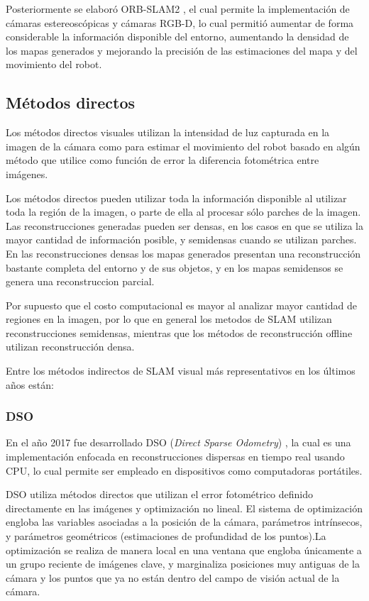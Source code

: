 Posteriormente se elaboró ORB-SLAM2 \cite{orbSlam2}, el cual permite la implementación de cámaras estereoscópicas y cámaras RGB-D,
lo cual permitió aumentar de forma considerable la información disponible del entorno, aumentando la densidad de los mapas generados y mejorando la precisión de las estimaciones del mapa y del movimiento del robot.


\subsection{Métodos directos}

Los métodos directos visuales utilizan la intensidad de luz capturada en la imagen de la cámara como para estimar el movimiento del robot basado en algún método que utilice como función de error la diferencia fotométrica entre imágenes. 

Los métodos directos pueden utilizar toda la información disponible al utilizar toda la región de la imagen, o parte de ella al procesar sólo parches de la imagen. Las reconstrucciones generadas pueden ser densas, en los casos en que se utiliza la mayor cantidad de información posible, y semidensas cuando se utilizan parches. En las reconstrucciones densas los mapas generados presentan una reconstrucción bastante completa del entorno y de sus objetos, y en los mapas semidensos se genera una reconstruccion parcial.

Por supuesto que el costo computacional es mayor al analizar mayor cantidad de regiones en la imagen, por lo que en general los metodos de SLAM utilizan reconstrucciones semidensas, mientras que los métodos de reconstrucción offline utilizan reconstrucción densa.

Entre los métodos indirectos de SLAM visual más representativos en los últimos
años están: 

\subsubsection{DSO}

En el año 2017 fue desarrollado DSO (\textit{Direct Sparse Odometry}) \cite{DSO}, la cual es una implementación enfocada en reconstrucciones dispersas en tiempo real usando CPU,  lo cual permite ser empleado en dispositivos como computadoras portátiles. 
	
DSO utiliza métodos directos que utilizan el error fotométrico definido directamente en las imágenes y optimización no lineal. El sistema de optimización engloba las variables asociadas a la posición de la cámara, parámetros intrínsecos, y parámetros geométricos (estimaciones de profundidad de los puntos).La optimización se realiza de manera local en una ventana que engloba únicamente a un grupo reciente de imágenes clave, y marginaliza posiciones muy antiguas de la cámara y los puntos que ya no están dentro del campo de visión actual de la cámara. 


